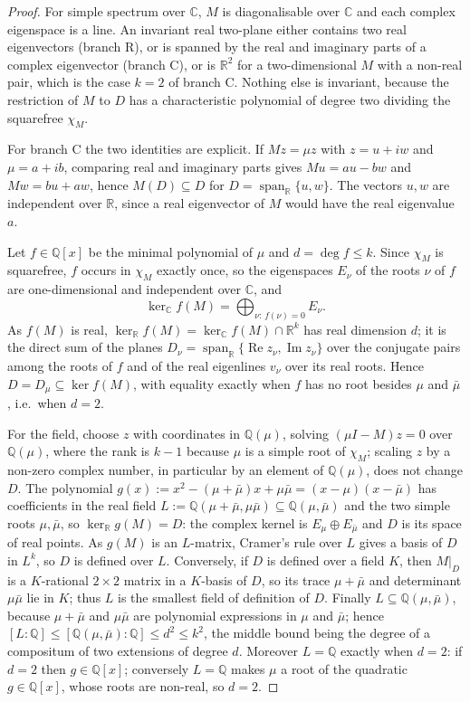 \documentclass[journal]{IEEEtran}
\theoremstyle{plainn}
\theoremstyle{remark}
\begin{document}
\begin{proof}
For simple spectrum over $\mathbb C$, $M$ is diagonalisable over $\mathbb C$ and each complex eigenspace
is a line. An invariant real two-plane either contains two real eigenvectors (branch R), or is spanned by
the real and imaginary parts of a complex eigenvector (branch C), or is $\mathbb R^2$ for a
two-dimensional $M$ with a non-real pair, which is the case $k=2$ of branch C. Nothing else is invariant,
because the restriction of $M$ to $D$ has a characteristic polynomial of degree two dividing the
squarefree $\chi_M$.

For branch C the two identities are explicit. If $Mz=\mu z$ with $z=u+iw$ and $\mu=a+ib$, comparing real
and imaginary parts gives $Mu=au-bw$ and $Mw=bu+aw$, hence $M(D)\subseteq D$ for
$D=\operatorname{span}_{\mathbb R}\{u,w\}$. The vectors $u,w$ are independent over $\mathbb R$, since a
real eigenvector of $M$ would have the real eigenvalue $a$.

Let $f\in\mathbb Q[x]$ be the minimal polynomial of $\mu$ and $d=\deg f\le k$. Since $\chi_M$ is
squarefree, $f$ occurs in $\chi_M$ exactly once, so the eigenspaces $E_\nu$ of the roots $\nu$ of $f$
are one-dimensional and independent over $\mathbb C$, and
\[
\ker_{\mathbb C}f(M)=\bigoplus_{\nu:\,f(\nu)=0}E_\nu .
\]
As $f(M)$ is real, $\ker_{\mathbb R}f(M)=\ker_{\mathbb C}f(M)\cap\mathbb R^k$ has real dimension $d$; it
is the direct sum of the planes
$D_\nu=\operatorname{span}_{\mathbb R}\{\operatorname{Re}z_\nu,\operatorname{Im}z_\nu\}$ over the
conjugate pairs among the roots of $f$ and of the real eigenlines $v_\nu$ over its real roots. Hence
$D=D_\mu\subseteq\ker f(M)$, with equality exactly when $f$ has no root besides $\mu$ and $\bar\mu$,
i.e.\ when $d=2$.

For the field, choose $z$ with coordinates in $\mathbb Q(\mu)$, solving $(\mu I-M)z=0$ over
$\mathbb Q(\mu)$, where the rank is $k-1$ because $\mu$ is a simple root of $\chi_M$; scaling $z$ by a
non-zero complex number, in particular by an element of $\mathbb Q(\mu)$, does not change $D$. The polynomial
$g(x):=x^2-(\mu+\bar\mu)x+\mu\bar\mu=(x-\mu)(x-\bar\mu)$ has coefficients in the real field
$L:=\mathbb Q(\mu+\bar\mu,\mu\bar\mu)\subseteq\mathbb Q(\mu,\bar\mu)$ and the two simple roots
$\mu,\bar\mu$, so $\ker_{\mathbb R}g(M)=D$: the complex kernel is $E_\mu\oplus E_{\bar\mu}$ and $D$ is its
space of real points. As $g(M)$ is an $L$-matrix, Cramer's rule over $L$ gives a basis of $D$ in
$L^k$, so $D$ is defined over $L$. Conversely, if $D$ is defined over a field $K$, then $M|_D$ is a
$K$-rational $2\times2$ matrix in a $K$-basis of $D$, so its trace $\mu+\bar\mu$ and determinant
$\mu\bar\mu$ lie in $K$; thus
$L$ is the smallest field of definition of $D$. Finally $L\subseteq\mathbb Q(\mu,\bar\mu)$, because
$\mu+\bar\mu$ and $\mu\bar\mu$ are polynomial expressions in $\mu$ and $\bar\mu$; hence
$[L:\mathbb Q]\le[\mathbb Q(\mu,\bar\mu):\mathbb Q]\le d^2\le k^2$, the middle bound being the degree of a
compositum of two extensions of degree $d$. Moreover
$L=\mathbb Q$ exactly when $d=2$: if $d=2$ then $g\in\mathbb Q[x]$; conversely $L=\mathbb Q$ makes $\mu$
a root of the quadratic $g\in\mathbb Q[x]$, whose roots are non-real, so $d=2$.


\end{proof}
\end{document}

